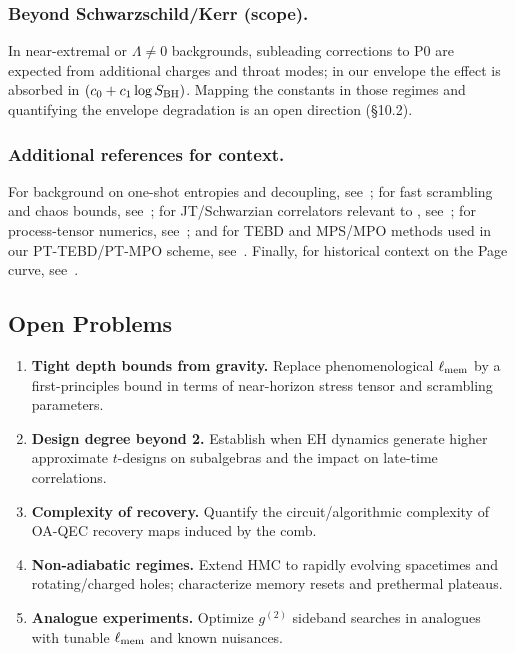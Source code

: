 \documentclass[11pt,a4paper]{article}
\newcommand{\HMC}{\textsc{HMC}\xspace}
\theoremstyle{plain}
\theoremstyle{definition}
\theoremstyle{remark}
\begin{document}
\subsubsection{Beyond Schwarzschild/Kerr (scope).}
In near-extremal or $\Lambda\!\ne\!0$ backgrounds, subleading corrections to
P0 are expected from additional charges and throat modes; in our envelope the
effect is absorbed in $(c_0+c_1\log S_{\rm BH})$.
Mapping the constants in those regimes and quantifying the envelope degradation
is an open direction (§10.2).

\subsubsection{Additional references for context.} For background on one-shot entropies and decoupling, see~\cite{Horodecki:2009}; for fast scrambling and chaos bounds, see~\cite{Sekino:2008,Maldacena:2016}; for JT/Schwarzian correlators relevant to , see~\cite{StanfordWitten:2017}; for process-tensor numerics, see~\cite{Strathearn:2018}; and for TEBD and MPS/MPO methods used in our PT-TEBD/PT-MPO scheme, see~\cite{Vidal:2003,Vidal:2004}. Finally, for historical context on the Page curve, see~\cite{Page:1976}.

\subsection*{Open Problems}
\begin{enumerate}[leftmargin=*]
\item \textbf{Tight depth bounds from gravity.} Replace phenomenological $\ell_{\rm mem}$ by a first-principles bound in terms of near-horizon stress tensor and scrambling parameters.
\item \textbf{Design degree beyond 2.} Establish when EH dynamics generate higher approximate $t$-designs on subalgebras and the impact on late-time correlations.
\item \textbf{Complexity of recovery.} Quantify the circuit/algorithmic complexity of OA-QEC recovery maps induced by the comb.
\item \textbf{Non-adiabatic regimes.} Extend \HMC{} to rapidly evolving spacetimes and rotating/charged holes; characterize memory resets and prethermal plateaus.
\item \textbf{Analogue experiments.} Optimize $g^{(2)}$ sideband searches in analogues with tunable $\ell_{\rm mem}$ and known nuisances.
\end{enumerate}
\end{document}
